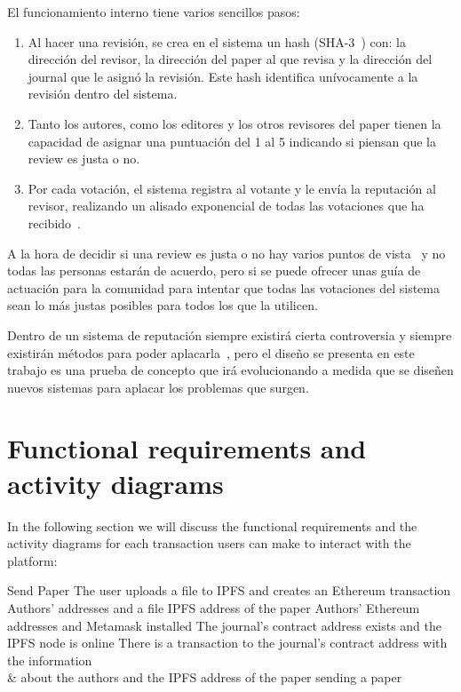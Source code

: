 El funcionamiento interno tiene varios sencillos pasos:
\begin{enumerate}
\item Al hacer una revisión, se crea en el sistema un hash
  (SHA-3~\cite{aumasson2008sha}) con: la dirección del revisor, la dirección del
  paper al que revisa y la dirección del journal que le asignó la revisión. Este
  hash identifica unívocamente a la revisión dentro del sistema.
\item Tanto los autores, como los editores y los otros revisores del paper
  tienen la capacidad de asignar una puntuación del 1 al 5 indicando si piensan
  que la review es justa o no.
\item Por cada votación, el sistema registra al votante y le envía la reputación
  al revisor, realizando un alisado exponencial de todas las votaciones que ha
  recibido~\cite{gardner1985exponential}.
\end{enumerate}

A la hora de decidir si una review es justa o no hay varios puntos de
vista~\cite{daniel1993guardians,cole1979fair} y no todas las personas estarán de
acuerdo, pero si se puede ofrecer unas guía de actuación para la comunidad para
intentar que todas las votaciones del sistema sean lo más justas posibles para
todos los que la utilicen.

Dentro de un sistema de reputación siempre existirá cierta controversia y
siempre existirán métodos para poder aplacarla~\cite{dellarocas2000immunizing},
pero el diseño se presenta en este trabajo es una prueba de concepto que irá
evolucionando a medida que se diseñen nuevos sistemas para aplacar los problemas
que surgen.

\section{Functional requirements and activity diagrams}

In the following section we will discuss the functional requirements and the
activity diagrams for each transaction users can make to interact with the
platform:


{Send Paper}%
{The user uploads a file to IPFS and creates an Ethereum
  transaction}%
{Authors' addresses and a file}%
{IPFS address of the paper}%
{Authors' Ethereum addresses and Metamask installed}%
{The journal's contract address exists and the IPFS node is
  online}%
{There is a transaction to the journal's contract address with the information\\
  & about the authors and the IPFS address of the paper }%
{sending a paper}%

